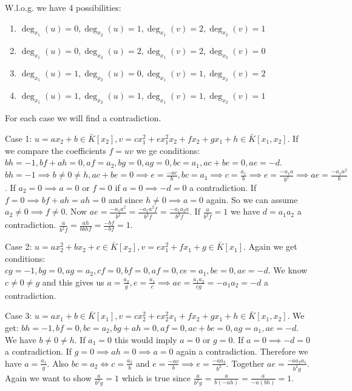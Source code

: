 \documentclass[12pt, a4paper]{article}
\begin{document}
W.l.o.g. we have 4 possibilities:
\begin{enumerate}
    \item $\deg_{x_1}(u) = 0, \deg_{x_2}(u) = 1, \deg_{x_1}(v) = 2, \deg_{x_2}(v)=1$
    \item $\deg_{x_1}(u) = 0, \deg_{x_2}(u) = 2, \deg_{x_1}(v) = 2, \deg_{x_2}(v)=0$
    \item $\deg_{x_1}(u) = 1, \deg_{x_2}(u) = 0, \deg_{x_1}(v) = 1, \deg_{x_2}(v)=2$
    \item $\deg_{x_1}(u) = 1, \deg_{x_2}(u) = 1, \deg_{x_1}(v) = 1, \deg_{x_2}(v)=1$
\end{enumerate}
For each case we will find a contradiction.

Case 1: $u = ax_2+b \in \bar{K}[x_2], v = cx_1^2+ex_1^2x_2+fx_2+gx_1+h \in \bar{K}[x_1,x_2]$. If we compare the coefficients $f = uv$ we ge conditions: $bh=-1, bf+ah=0, af=a_2, bg=0, ag=0, bc=a_1, ac+be=0, ae=-d$.
$bh = -1 \implies b \neq 0 \neq h, ac+be= 0 \implies e = \frac{-ac}{b}, bc=a_1 \implies c = \frac{a_1}{b} \implies e = \frac{-a_1a}{b^2} \implies ae = \frac{-a_1a^2}{b}$. If $a_2 =0 \implies a=0$ or $f = 0$ if $a=0 \implies -d = 0$ a contradiction. If $f = 0 \implies bf+ah = ah = 0$ and since $h \neq 0 \implies a = 0$ again. So we can assume $a_2 \neq 0 \implies f \neq 0$. Now $ae = \frac{-a_1a^2}{b^2} = \frac{-a_1a^2f}{b^2f} = \frac{-a_1a_2a}{b^2f}$. If $\frac{a}{b^2f} = 1$ we have $d = a_1a_2$ a contradiction. $\frac{a}{b^2f} = \frac{ah}{bbhf} = \frac{-bf}{-bf} = 1$.

Case 2: $u = ax_2^2+bx_2+c \in \bar{K}[x_2], v = ex_1^2+fx_1+g \in \bar{K}[x_1]$. Again we get conditions: $cg=-1, bg=0, ag=a_2, cf=0,bf=0, af=0, ce=a_1, be=0, ae=-d$. We know $c \neq 0 \neq g$ and this gives us $a = \frac{a_2}{g}, e = \frac{a_1}{c} \implies ae = \frac{a_1a_2}{cg} = -a_1a_2 = -d$ a contradiction.

Case 3: $u = ax_1+b \in \bar{K}[x_1], v = cx_2^2+ex_2^2x_1+fx_2+gx_1+h \in \bar{K}[x_1,x_2]$. We get: $bh=-1, bf=0, bc=a_2, bg+ah=0, af=0, ac+be=0, ag=a_1, ae=-d$. We have $b \neq 0 \neq h$. If $a_1 = 0$ this would imply $a = 0$ or $g = 0$. If $a = 0 \implies -d = 0$ a contradiction. If $g = 0 \implies ah = 0 \implies a = 0$ again a contradiction. Therefore we have $a = \frac{a_1}{g}$. Also $bc=a_2 \iff c = \frac{a_2}{b}$ and $e = \frac{-ac}{b} \implies e = \frac{-aa_2}{b^2}$. Together $ae = \frac{-aa_2a_1}{b^2g}$. Again we want to show $\frac{a}{b^2g} = 1$ which is true since $\frac{a}{b^2g}=\frac{a}{b(-ah)} = \frac{a}{-a(bh)} = 1$.
\end{document}
